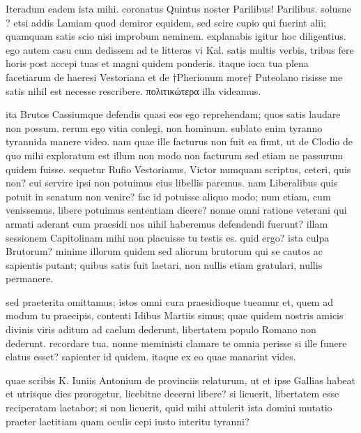 


 Iteradum eadem ista mihi. coronatus Quintus noster Parilibus! Parilibus. solusne ? etsi addis Lamiam quod demiror equidem, sed scire cupio qui fuerint alii; quamquam satis scio nisi improbum neminem. explanabis igitur hoc diligentius. ego autem casu cum dedissem ad te litteras vi Kal. satis multis verbis, tribus fere horis post accepi tuas et magni quidem ponderis. itaque ioca tua plena facetiarum de haeresi Vestoriana et de †Pherionum more† Puteolano risisse me satis nihil est necesse rescribere. πολιτικώτερα illa videamus.

 ita Brutos Cassiumque defendis quasi eos ego reprehendam; quos satis laudare non possum. rerum ego vitia conlegi, non hominum. sublato enim tyranno tyrannida manere video. nam quae ille facturus non fuit ea fiunt, ut de Clodio de quo mihi exploratum est illum non modo non facturum sed etiam ne passurum quidem fuisse. sequetur Rufio Vestorianus, Victor numquam scriptus, ceteri, quis non? cui servire ipsi non potuimus eius libellis paremus. nam Liberalibus quis potuit in senatum non venire? fac id potuisse aliquo modo; num etiam, cum venissemus, libere potuimus sententiam dicere? nonne omni ratione veterani qui armati aderant cum praesidi nos nihil haberemus defendendi fuerunt? illam sessionem Capitolinam mihi non placuisse tu testis es. quid ergo? ista culpa Brutorum? minime illorum quidem sed aliorum brutorum qui se cautos ac sapientis putant; quibus satis fuit laetari, non nullis etiam gratulari, nullis permanere.

 sed praeterita omittamus; istos omni cura praesidioque tueamur et, quem ad modum tu praecipis, contenti Idibus Martiis simus; quae quidem nostris amicis divinis viris aditum ad caelum dederunt, libertatem populo Romano non dederunt. recordare tua. nonne meministi clamare te omnia perisse si ille funere elatus esset? sapienter id quidem. itaque ex eo quae manarint vides.

 quae scribis K. Iuniis Antonium de provinciis relaturum, ut et ipse Gallias habeat et utrisque dies prorogetur, licebitne decerni libere? si licuerit, libertatem esse reciperatam laetabor; si non licuerit, quid mihi attulerit ista domini mutatio praeter laetitiam quam oculis cepi iusto interitu tyranni?

